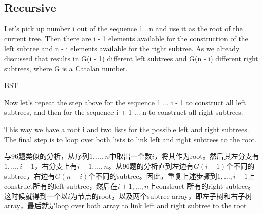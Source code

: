 \subsection{Recursive}
Let's pick up number i out of the sequence 1 ..n and use it as the root of the current tree. Then there are i - 1 elements available for the construction of the left subtree and n - i elements available for the right subtree. As we already discussed that results in G(i - 1) different left subtrees and G(n - i) different right subtrees, where G is a Catalan number.

BST

Now let's repeat the step above for the sequence 1 ... i - 1 to construct all left subtrees, and then for the sequence i + 1 ... n to construct all right subtrees.

This way we have a root i and two lists for the possible left and right subtrees. The final step is to loop over both lists to link left and right subtrees to the root.

\begin{CJK*}{UTF8}{gbsn}
与96题类似的分析，从序列$1,\ldots,n$中取出一个数$i$，将其作为root。然后其左分支有$1,\ldots,i-1$，右分支上有$i+1,\ldots,n$。从96题的分析直到左边有$G(i-1)$个不同的subtree，右边有$G(n-i)$个不同的subtree。因此，重复上述步骤到$1,\ldots, i-1$上construct所有的left subtree，然后在$i+1,\ldots,n$上construct 所有的right subtree。 这时候就得到一个以$i$为节点的root，以及两个subtree array，即左子树和右子树array，最后就是loop over both array to link left and right subtree to the root
\end{CJK*}
